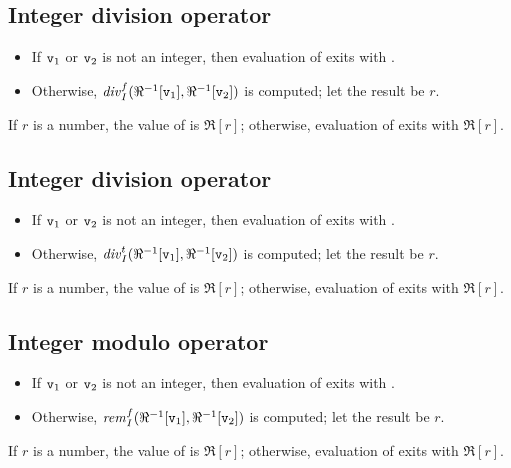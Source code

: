 \ifStd
\subsection{Integer division operator \T{//}}

\label{section:intdiv-f}

\begin{itemize}
\item If ${\tt{\sl v}}_1$ or ${\tt{\sl v}}_2$ is not an integer, then
evaluation of  exits with \T{\badarith}.
\item Otherwise, $\mathit{div}_I^f(\Re^{-1}[{\tt{\sl v}}_1],\Re^{-1}[{\tt{\sl v}}_2])$ is computed;
let the result be $r$.
\end{itemize}
If $r$ is a number, the value of  is $\Re[r]$;
otherwise, evaluation of  exits with $\Re[r]$.
\fi

\subsection{Integer division operator }

\label{section:intdiv}

\begin{itemize}
\item If ${\tt{\sl v}}_1$ or ${\tt{\sl v}}_2$ is not an integer, then
evaluation of  exits with \T{\badarith}.
\item Otherwise, $\mathit{div}_I^t(\Re^{-1}[{\tt{\sl v}}_1],\Re^{-1}[{\tt{\sl v}}_2])$ is computed;
let the result be $r$.
\end{itemize}
If $r$ is a number, the value of  is $\Re[r]$;
otherwise, evaluation of  exits with $\Re[r]$.

\ifStd
\subsection{Integer modulo operator }

\label{section:intmod}

\begin{itemize}
\item If ${\tt{\sl v}}_1$ or ${\tt{\sl v}}_2$ is not an integer, then
evaluation of  exits with \T{\badarith}.
\item Otherwise, $\mathit{rem}_I^f(\Re^{-1}[{\tt{\sl v}}_1],\Re^{-1}[{\tt{\sl v}}_2])$ is computed;
let the result be $r$.
\end{itemize}
If $r$ is a number, the value of  is $\Re[r]$;
otherwise, evaluation of  exits with $\Re[r]$.
\fi

